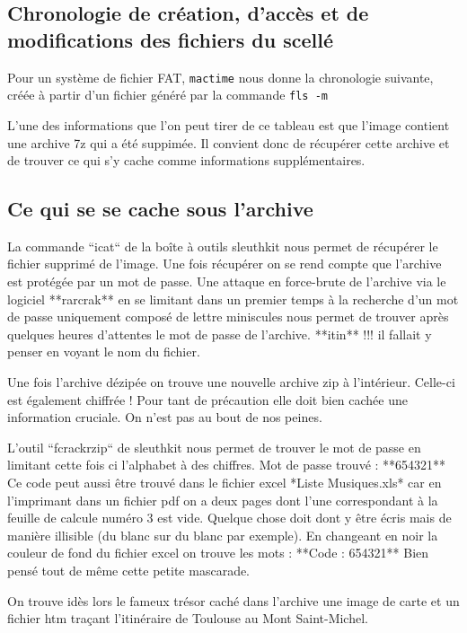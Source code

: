 \documentclass[a4paper,11pt]{article}
\begin{document}
    \subsection{Chronologie de création, d'accès et de modifications des fichiers du scellé}

    Pour un système de fichier FAT, {\tt mactime} nous donne la chronologie suivante, créée à 
    partir d'un fichier généré par la commande {\tt fls -m}



L'une des informations que l'on peut tirer de ce tableau est que l'image contient une
archive 7z qui a été suppimée. Il convient donc de récupérer cette archive et de trouver
ce qui s'y cache comme informations supplémentaires.

\subsection{Ce qui se se cache sous l'archive}

La commande ``icat`` de la boîte à outils sleuthkit nous permet de récupérer le fichier
supprimé de l'image. Une fois récupérer on se rend compte que l'archive est protégée par
un mot de passe. 
Une attaque en force-brute de l'archive via le logiciel **rarcrak** en se limitant dans un premier
temps à la recherche d'un mot de passe uniquement composé de lettre miniscules nous permet
de trouver après quelques heures d'attentes le mot de passe de l'archive. **itin** !!!
il fallait y penser en voyant le nom du fichier.

Une fois l'archive dézipée on trouve une nouvelle archive zip à l'intérieur. Celle-ci est
également chiffrée ! Pour tant de précaution elle doit bien cachée une information
cruciale. On n'est pas au bout de nos peines.

L'outil ``fcrackrzip`` de sleuthkit nous permet de trouver le mot de passe en limitant
cette fois ci l'alphabet à des chiffres. Mot de passe trouvé : **654321**
Ce code peut aussi être trouvé dans le fichier excel *Liste Musiques.xls* car en
l'imprimant dans un fichier pdf on a deux pages dont l'une correspondant à la feuille de
calcule numéro 3 est vide. Quelque chose doit dont y être écris mais de manière illisible
(du blanc sur du blanc par exemple). En changeant en noir la couleur de fond du fichier
excel on trouve les mots : **Code : 654321** Bien pensé tout de même cette petite
mascarade.

On trouve idès lors le fameux trésor caché dans l'archive une image de carte  et un fichier htm traçant l'itinéraire de
Toulouse au Mont Saint-Michel.
\end{document}
